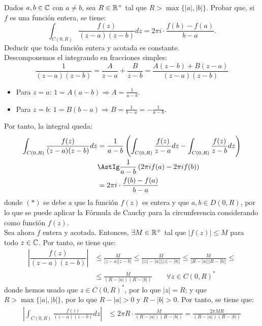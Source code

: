 \begin{ejercicio}
    Dados $a,b \in \mathbb{C}$ con $a \neq b$, sea $R \in \mathbb{R}^+$ tal que $R > \max\{|a|,|b|\}$. Probar que, si $f$ es una función entera, se tiene:
    \[
        \int_{C(0,R)} \frac{f(z)}{(z-a)(z-b)}dz = 2\pi i \cdot \frac{f(b)-f(a)}{b-a}.
    \]
    Deducir que toda función entera y acotada es constante.\\

    Descomponemos el integrando en fracciones simples:
    \begin{equation*}
        \frac{1}{(z-a)(z-b)} = \frac{A}{z-a} + \frac{B}{z-b} = \frac{A(z-b)+B(z-a)}{(z-a)(z-b)}
    \end{equation*}
    \begin{itemize}
        \item Para $z=a$: $1=A(a-b)\Longrightarrow A=\frac{1}{a-b}$.
        \item Para $z=b$: $1=B(b-a)\Longrightarrow B=\frac{1}{b-a}=-\frac{1}{a-b}$.
    \end{itemize}

    Por tanto, la integral queda:
    \begin{align*}
        \int_{C(0,R)} \frac{f(z)}{(z-a)(z-b)}dz &= \frac{1}{a-b}\left(\int_{C(0,R)} \frac{f(z)}{z-a}dz - \int_{C(0,R)} \frac{f(z)}{z-b}dz\right)\\
        &\AstIg \frac{1}{a-b}\left(2\pi i f(a) - 2\pi i f(b)\right)\\
        &= 2\pi i \cdot \frac{f(b)-f(a)}{b-a}
    \end{align*}
    donde $(\ast)$ se debe a que la función $f(z)$ es entera y que $a,b\in D(0,R)$, por lo que se puede aplicar la Fórmula de Cauchy para la circunferencia considerando como función $f(z)$.\\

    Sea ahora $f$ entera y acotada. Entonces, $\exists M\in \mathbb{R}^+$ tal que $|f(z)|\leq M$ para todo $z\in \mathbb{C}$. Por tanto, se tiene que:
    \begin{align*}
        \left|\dfrac{f(z)}{(z-a)(z-b)}\right| &\leq \frac{M}{|z-a||z-b|}
        \leq \frac{M}{\left||z| - |a|\right|\left||z| - |b|\right|}
        \leq \frac{M}{\left|R - |a|\right|\left|R - |b|\right|}
        \leq\\&\leq  \frac{M}{(R-|a|)(R-|b|)}\qquad \forall z\in C(0,R)^*
    \end{align*}
    donde hemos usado que $z\in C(0,R)^*$, por lo que $|z|=R$; y que $R>\max\{|a|,|b|\}$, por lo que $R-|a|>0$ y $R-|b|>0$. Por tanto, se tiene que:
    \begin{align*}
        \left|\int_{C(0,R)} \frac{f(z)}{(z-a)(z-b)}dz\right| & \leq 2\pi R \cdot \frac{M}{(R-|a|)(R-|b|)} = \frac{2\pi M R}{(R-|a|)(R-|b|)}
    \end{align*}


\end{ejercicio}
